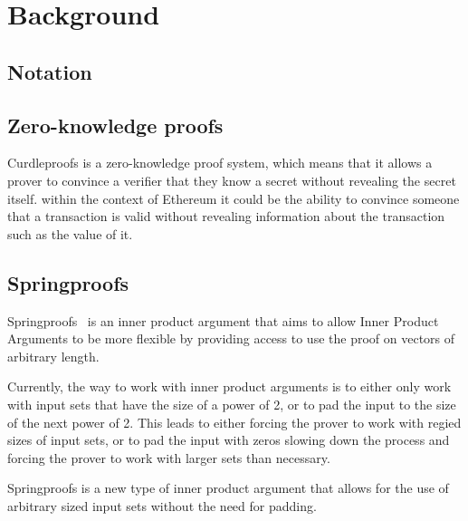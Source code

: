 
\section{Background}\label{sec:background}


\subsection{Notation}\label{sec:background-notation}




\subsection{Zero-knowledge proofs}\label{sec:background-zkps}
Curdleproofs is a zero-knowledge proof system, which means that it allows a prover to convince a verifier that they know a secret without revealing the secret itself.
within the context of Ethereum it could be the ability to convince someone that a transaction is valid without revealing information about the transaction such as the value of it.




\subsection{Springproofs}\label{sec:background-springproofs}
Springproofs~\cite{zhang2024springproofs} is an inner product argument that aims to allow Inner Product Arguments to be more flexible by providing access to use the proof on vectors of arbitrary length.

Currently, the way to work with inner product arguments is to either only work with input sets that have the size of a power of 2, or to pad the input to the size of the next power of 2.
This leads to either forcing the prover to work with regied sizes of input sets, or to pad the input with zeros slowing down the process and forcing the prover to work with larger sets than necessary.

Springproofs is a new type of inner product argument that allows for the use of arbitrary sized input sets without the need for padding.



